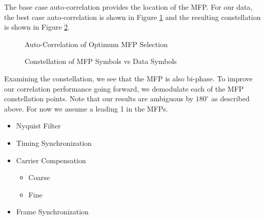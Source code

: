 \documentclass[conference,onecolumn]{IEEEtran}
\begin{document}
The base case auto-correlation provides the location of the MFP. For our data, the best case auto-correlation is shown in Figure \ref{fig::mfp_correlation} and the resulting constellation is shown in Figure \ref{fig::mfp_constellation}.

\begin{figure}[H]
	\centerline{}
	\caption{Auto-Correlation of Optimum MFP Selection}
	\label{fig::mfp_correlation}
\end{figure}

\begin{figure}[H]
	\centerline{}
	\caption{Constellation of MFP Symbols vs Data Symbols}
	\label{fig::mfp_constellation}
\end{figure}

Examining the constellation, we see that the MFP is also bi-phase. To 
improve our correlation performance going forward, we demodulate each of the MFP constellation points. Note that our results are ambiguous by $180^{\circ}$ as described above. For now we assume a leading 1 in the MFPs.



\begin{itemize}
	\item Nyquist Filter
	\item Timing Synchronization
	\item Carrier Compensation
	\begin{itemize}
		\item Coarse
		\item Fine
	\end{itemize}
	\item Frame Synchronization
\end{itemize}

\nocite{5586866}
\nocite{a2008_us8260192b2}
\nocite{marko_2012_us8667344b2}
\nocite{collins_2018_softwaredefined}
\nocite{chaudhari_2022_timing}
\nocite{650240}

{}
%
\end{document}
